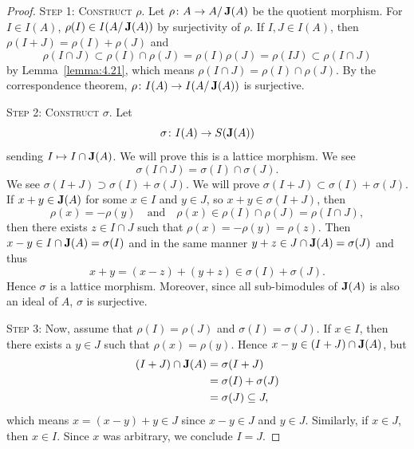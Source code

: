 \begin{proof}
\textsc{Step 1: Construct $\rho$}. Let $\rho\colon A\to A/\operatorname{\textup{\textbf{J}}}(A)$
be the quotient morphism. For $I\in I(A)$, $\rho(I)\in I(A/\operatorname{\textup{\textbf{J}}}(A))$
by surjectivity of $\rho$. If $I,J\in I(A)$, then $\rho(I+J)=\rho(I)+\rho(J)$
and
\begin{equation}
\rho(I\cap J)\subset\rho(I)\cap\rho(J)=\rho(I)\rho(J)=\rho(IJ)\subset\rho(I\cap J)
\end{equation}
by Lemma~\ref{lemma:4.21}, which means $\rho(I\cap J)=\rho(I)\cap\rho(J)$.
By the correspondence theorem, $\rho\colon I(A)\to I(A/\operatorname{\textup{\textbf{J}}}(A))$
is surjective.

\textsc{Step 2: Construct $\sigma$}. Let
\begin{equation}
\sigma\colon I(A)\to S(\operatorname{\textup{\textbf{J}}}(A))
\end{equation}
sending $I\mapsto I\cap\operatorname{\textup{\textbf{J}}}(A)$. We will prove this is a lattice
morphism. We see
\begin{equation}
\sigma(I\cap J)=\sigma(I)\cap\sigma(J).
\end{equation}
We see $\sigma(I+J)\supset\sigma(I)+\sigma(J)$. We will prove
$\sigma(I+J)\subset\sigma(I)+\sigma(J)$. If $x+y\in\operatorname{\textup{\textbf{J}}}(A)$
for some $x\in I$ and $y\in J$, so $x+y\in\sigma(I+J)$, then
\begin{equation}
\rho(x)=-\rho(y)\quad\mbox{and}\quad\rho(x)\in\rho(I)\cap\rho(J)=\rho(I\cap J),
\end{equation}
then there exists $z\in I\cap J$ such that
$\rho(x)=-\rho(y)=\rho(z)$. Then $x-y\in I\cap\operatorname{\textup{\textbf{J}}}(A)=\sigma(I)$
and in the same manner $y+z\in J\cap\operatorname{\textup{\textbf{J}}}(A)=\sigma(J)$ and thus
\begin{equation}
x+y=(x-z)+(y+z)\in\sigma(I)+\sigma(J).
\end{equation}
Hence $\sigma$ is a lattice morphism. Moreover, since all
sub-bimodules of $\operatorname{\textup{\textbf{J}}}(A)$ is also an ideal of $A$, $\sigma$ is surjective.

\textsc{Step 3:} Now, assume that $\rho(I)=\rho(J)$ and $\sigma(I)=\sigma(J)$.
If $x\in I$, then there exists a $y\in J$ such that $\rho(x)=\rho(y)$.
Hence $x-y\in(I+J)\cap\operatorname{\textup{\textbf{J}}}(A)$, but
\begin{subequations}
  \begin{align}
(I+J)\cap\operatorname{\textup{\textbf{J}}}(A) 
    &=\sigma(I+J)\\
    &=\sigma(I)+\sigma(J)\\
    &=\sigma(J)\subseteq J,
  \end{align}
\end{subequations}
which means $x=(x-y)+y\in J$ since $x-y\in J$ and $y\in J$. Similarly,
if $x\in J$, then $x\in I$. Since $x$ was arbitrary, we conclude $I=J$.
\end{proof}

